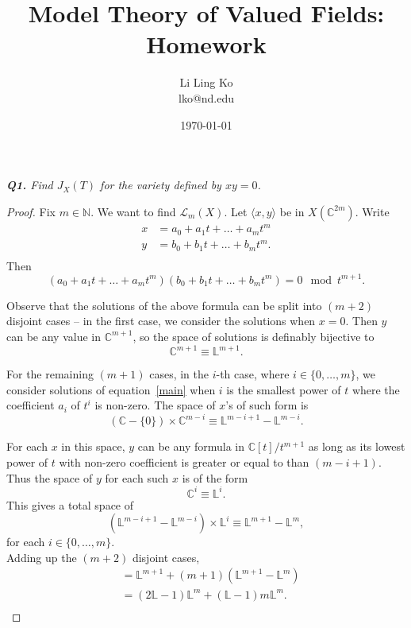 \documentclass{article}
\begin{document}
\title{Model Theory of Valued Fields: Homework}
\author{Li Ling Ko\\ lko@nd.edu}
\date{\today}
\maketitle

\it \textbf{Q1.} Find $J_X(T)$ for the variety defined by $xy=0$.
\begin{proof}
  Fix $m\in\mathbb{N}$. We want to find $\mathcal{L}_m(X)$. Let $\langle x,
  y\rangle$ be in $X(\mathbb{C}^{2m})$. Write
  \begin{align*}
    x &=a_0+a_1t+\ldots+a_mt^m\\
    y &=b_0+b_1t+\ldots+b_mt^m.\\
  \end{align*}
  Then
  \begin{equation}
    \label{main}
    (a_0+a_1t+\ldots+a_mt^m) (b_0+b_1t+\ldots+b_mt^m)=0 \mod t^{m+1}.
  \end{equation}

  Observe that the solutions of the above formula can be split into $(m+2)$
  disjoint cases -- in the first case, we consider the solutions when
  $x=0$. Then $y$ can be any value in $\mathbb{C}^{m+1}$, so the space of
  solutions is definably bijective to 
  \[\mathbb{C}^{m+1} \equiv \mathbb{L}^{m+1}.\]

  For the remaining $(m+1)$ cases, in the $i$-th case, where
  $i\in\{0,\ldots,m\}$, we consider solutions of equation~\eqref{main} when
  $i$ is the smallest power of $t$ where the coefficient $a_i$ of $t^i$ is
  non-zero. The space of $x$'s of such form is
  \[(\mathbb{C}-\{0\}) \times\mathbb{C}^{m-i} \equiv
  \mathbb{L}^{m-i+1}-\mathbb{L}^{m-i}.\]

  For each $x$ in this space, $y$ can be any formula in
  $\mathbb{C}[t]/t^{m+1}$ as long as its lowest power of $t$ with non-zero
  coefficient is greater or equal to than $(m-i+1)$. Thus the space of $y$
  for each such $x$ is of the form
  \[\mathbb{C}^{i} \equiv \mathbb{L}^{i}.\]
  This gives a total space of
  \[(\mathbb{L}^{m-i+1}-\mathbb{L}^{m-i}) \times\mathbb{L}^{i} \equiv
  \mathbb{L}^{m+1}-\mathbb{L}^{m},\]
  for each $i\in\{0,\ldots,m\}$. \\

  Adding up the $(m+2)$ disjoint cases,
  \begin{align*}
    [\mathcal{L}_m(X)] &=\mathbb{L}^{m+1}
      +(m+1)(\mathbb{L}^{m+1}-\mathbb{L}^{m})\\
      &=(2\mathbb{L}-1)\mathbb{L}^m +(\mathbb{L}-1)m\mathbb{L}^m.\\
  \end{align*}


\end{proof}
\end{document}
